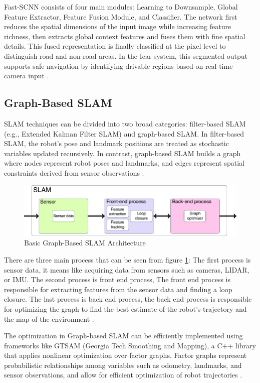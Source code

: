 \documentclass[conference]{IEEEtran}
\begin{document}
Fast-SCNN consists of four main modules: Learning to Downsample, Global Feature Extractor, Feature Fusion Module, and Classifier. The network first reduces the spatial dimensions of the input image while increasing feature richness, then extracts global context features and fuses them with fine spatial details. This fused representation is finally classified at the pixel level to distinguish road and non-road areas. In the Icar system, this segmented output supports safe navigation by identifying drivable regions based on real-time camera input \cite{ref_fast_scnn}.


\subsection{Graph-Based SLAM}
SLAM techniques can be divided into two broad categories: filter-based SLAM (e.g., Extended Kalman Filter SLAM) and graph-based SLAM. In filter-based SLAM, the robot's pose and landmark positions are treated as stochastic variables updated recursively. In contrast, graph-based SLAM builds a graph where nodes represent robot poses and landmarks, and edges represent spatial constraints derived from sensor observations \cite{thrun2005probabilistic}.

\begin{figure}[H]
	\centering
	\includegraphics[width=\linewidth]{../konten/gb_slam.png}
	\caption{Basic Graph-Based SLAM Architecture \cite{ref_gb_slam}}
	\label{fig:basic_graph_based_slam}
\end{figure} 

There are three main process that can be seen from figure \ref{fig:basic_graph_based_slam}: The first process is sensor data, it means like acquiring data from sensors such as cameras, LIDAR, or IMU. The second process is front end process, The front end process is responsible for extracting features from the sensor data and finding a loop closure. The last process is back end process, the back end process is responsible for optimizing the graph to find the best estimate of the robot's trajectory and the map of the environment \cite{ref_gb_slam}.

\par
The optimization in Graph-based SLAM can be efficiently implemented using frameworks like GTSAM (Georgia Tech Smoothing and Mapping), a C++ library that applies nonlinear optimization over factor graphs. Factor graphs represent probabilistic relationships among variables such as odometry, landmarks, and sensor observations, and allow for efficient optimization of robot trajectories \cite{ref_gtsam}.
\end{document}
